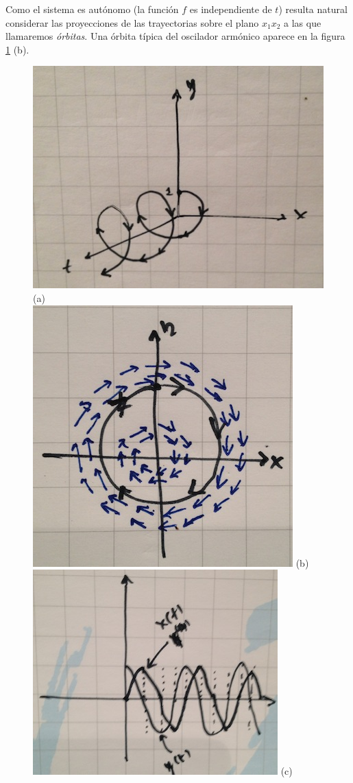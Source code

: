 \documentclass[11pt]{book}
\theoremstyle{definition}
\numberwithin{definition}{section}
\theoremstyle{theorem}
\numberwithin{theorem}{section}
\numberwithin{lemma}{section}
\numberwithin{corollary}{section}
\theoremstyle{plain}
\numberwithin{example}{section}
\begin{document}
Como el sistema es autónomo (la función $f$ es independiente de $t$) resulta natural considerar las proyecciones de las trayectorias sobre el plano $x_1x_2$ a las que llamaremos \emph{órbitas}. Una órbita típica del oscilador armónico aparece en la figura \ref{fig:osciladorarmonico} (b).

\begin{figure}
\centering \label{fig:osciladorarmonico}
    \includegraphics[scale=0.5]{figures/osciladorarmonico-solucion.jpg} (a) \\
    \includegraphics[scale=0.5]{figures/osciladorarmonico-orbita.jpg} (b) \\
    \includegraphics[scale=0.5]{figures/osciladorarmonico-soluciones.jpg} (c) \\

\end{figure}
\end{document}
